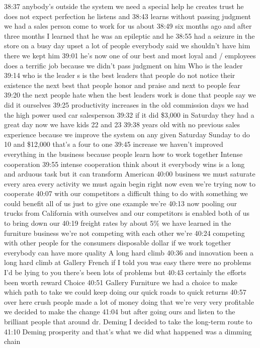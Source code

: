\documentclass[
]{book}
\begin{document}
38:37
anybody's outside the system we need a special help he creates trust he does not expect perfection he listens and
38:43
learns without passing judgment we had a sales person come to work for us about
38:49
six months ago and after three months I learned that he was an epileptic and he
38:55
had a seizure in the store on a busy day upset a lot of people everybody said we shouldn't have him there we kept him
39:01
he's now one of our best and most loyal and / employees does a terrific job because we didn't pass judgment on him
Who is the leader
39:14
who is the leader s is the best leaders that people do not notice their existence the next best that people honor and praise and next to people fear
39:20
the next people hate when the best leaders work is done that people say we did it ourselves
39:25
productivity increases in the old commission days we had the high power used car salesperson
39:32
if it did \$3,000 in Saturday they had a great day now we have kids 22 and 23
39:38
years old with no previous sales experience because we improve the system on any given Saturday Sunday to do 10 and \$12,000 that's a four to one
39:45
increase we haven't improved everything in the business because people learn how to work together
Intense cooperation
39:55
intense cooperation think about it everybody wins is a long and arduous task but it can transform American
40:00
business we must saturate every area every activity we must again begin right now even we're trying now to cooperate
40:07
with our competitors a difficult thing to do with something we could benefit all of us just to give one example we're
40:13
now pooling our trucks from California with ourselves and our competitors is enabled both of us to bring down our
40:19
freight rates by about 5\% we have learned in the furniture business we're not competing with each other we're
40:24
competing with other people for the consumers disposable dollar if we work together everybody can have more quality
A long hard climb
40:36
and innovation been a long hard climb at Gallery French if I told you was easy there were no problems I'd be lying to you there's been lots of problems but
40:43
certainly the efforts been worth reward
Choice
40:51
Gallery Furniture we had a choice to make which path to take we could keep doing our quick roads to quick returns
40:57
over here crush people made a lot of money doing that we're very very profitable we decided to make the change
41:04
but after going ours and listen to the brilliant people that around dr. Deming I decided to take the long-term route to
41:10
Deming prosperity and that's what we did what happened was a dimming chain
\end{document}
